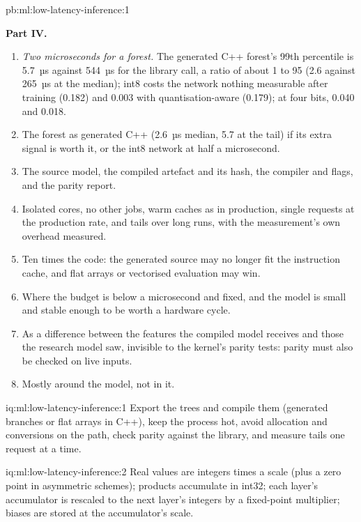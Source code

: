\begin{solution}{pb:ml:low-latency-inference:1}
\begin{enumerate}[resume]
\end{enumerate}
\textbf{Part IV.}
\begin{enumerate}[resume]
\item \emph{Two microseconds for a forest.} The generated C++ forest's 99th percentile is 5.7~µs against 544~µs for the library
call, a ratio of about 1 to 95 (2.6 against 265~µs at the median); int8  costs the network nothing measurable after
training (0.182) and 0.003 with quantisation-aware  (0.179); at four bits, 0.040 and 0.018.
\item The forest as generated C++ (2.6~µs median, 5.7 at the tail) if its extra signal is worth it, or the int8 network at half a
microsecond.
\item The source model, the compiled artefact and its hash, the compiler and flags, and the parity report.
\item Isolated cores, no other jobs, warm caches as in production, single requests at the production rate, and tails over long
runs, with the measurement's own overhead measured.
\item Ten times the code: the generated source may no longer fit the instruction cache, and flat arrays or vectorised evaluation
may win.
\item Where the budget is below a microsecond and fixed, and the model is small and stable enough to be worth a hardware cycle.
\item As a difference between the features the compiled model receives and those the research model saw, invisible to the
kernel's parity tests: parity must also be checked on live inputs.
\item Mostly around the model, not in it.
\end{enumerate}
\end{solution}

\begin{solution}{iq:ml:low-latency-inference:1}
Export the trees and compile them (generated branches or flat arrays in C++), keep the process hot, avoid allocation and
conversions on the path, check parity against the library, and measure tails one request at a time.
\end{solution}

\begin{solution}{iq:ml:low-latency-inference:2}
Real values are integers times a scale (plus a zero point in asymmetric schemes); products accumulate in int32; each layer's
accumulator is rescaled to the next layer's integers by a fixed-point multiplier; biases are stored at the accumulator's scale.
\end{solution}

